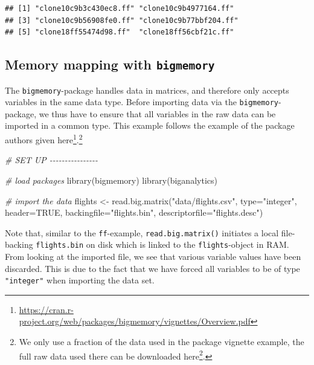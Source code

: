\documentclass[
  12pt,
]{style/krantz}
\newenvironment{Shaded}{\begin{snugshade}}{\end{snugshade}}
\newcommand{\AttributeTok}[1]{\textcolor[rgb]{0.77,0.63,0.00}{#1}}
\newcommand{\CommentTok}[1]{\textcolor[rgb]{0.56,0.35,0.01}{\textit{#1}}}
\newcommand{\ConstantTok}[1]{\textcolor[rgb]{0.00,0.00,0.00}{#1}}
\newcommand{\FunctionTok}[1]{\textcolor[rgb]{0.00,0.00,0.00}{#1}}
\newcommand{\NormalTok}[1]{#1}
\newcommand{\OtherTok}[1]{\textcolor[rgb]{0.56,0.35,0.01}{#1}}
\newcommand{\StringTok}[1]{\textcolor[rgb]{0.31,0.60,0.02}{#1}}
\renewcommand{\href}[2]{#2\footnote{\url{#1}}}
\begin{document}
\begin{verbatim}
## [1] "clone10c9b3c430ec8.ff" "clone10c9b4977164.ff" 
## [3] "clone10c9b56908fe0.ff" "clone10c9b77bbf204.ff"
## [5] "clone18ff55474d98.ff"  "clone18ff56cbf21c.ff"
\end{verbatim}

\hypertarget{memory-mapping-with-bigmemory}{%
\subsection{\texorpdfstring{Memory mapping with \texttt{bigmemory}}{Memory mapping with bigmemory}}\label{memory-mapping-with-bigmemory}}

The \texttt{bigmemory}-package handles data in matrices, and therefore only accepts variables in the same data type. Before importing data via the \texttt{bigmemory}-package, we thus have to ensure that all variables in the raw data can be imported in a common type. This example follows the example of the package authors given \href{https://cran.r-project.org/web/packages/bigmemory/vignettes/Overview.pdf}{here}.\footnote{We only use a fraction of the data used in the package vignette example, the full raw data used there can be downloaded \href{http://stat-computing.org/dataexpo/2009/the-data.html}{here}.}

\begin{Shaded}
\begin{Highlighting}[]
\CommentTok{\# SET UP {-}{-}{-}{-}{-}{-}{-}{-}{-}{-}{-}{-}{-}{-}{-}{-}}

\CommentTok{\# load packages}
\FunctionTok{library}\NormalTok{(bigmemory)}
\FunctionTok{library}\NormalTok{(biganalytics)}

\CommentTok{\# import the data}
\NormalTok{flights }\OtherTok{\textless{}{-}} \FunctionTok{read.big.matrix}\NormalTok{(}\StringTok{"data/flights.csv"}\NormalTok{,}
                     \AttributeTok{type=}\StringTok{"integer"}\NormalTok{,}
                     \AttributeTok{header=}\ConstantTok{TRUE}\NormalTok{,}
                     \AttributeTok{backingfile=}\StringTok{"flights.bin"}\NormalTok{,}
                     \AttributeTok{descriptorfile=}\StringTok{"flights.desc"}\NormalTok{)}
\end{Highlighting}
\end{Shaded}

Note that, similar to the \texttt{ff}-example, \texttt{read.big.matrix()} initiates a local file-backing \texttt{flights.bin} on disk which is linked to the \texttt{flights}-object in RAM. From looking at the imported file, we see that various variable values have been discarded. This is due to the fact that we have forced all variables to be of type \texttt{"integer"} when importing the data set.
\end{document}
